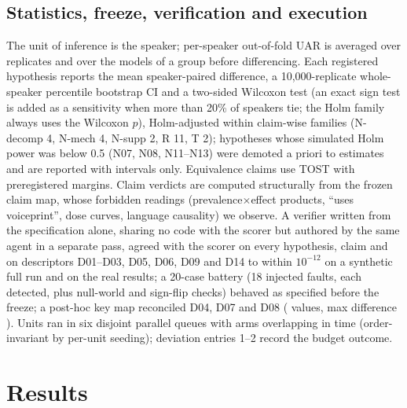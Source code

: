 \documentclass{article}
\begin{document}
\subsection{Statistics, freeze, verification and execution}
The unit of inference is the speaker; per-speaker out-of-fold UAR is averaged over replicates and over the models of a group before differencing.
Each registered hypothesis reports the mean speaker-paired difference, a 10,000-replicate whole-speaker percentile bootstrap CI and a two-sided Wilcoxon test (an exact sign test is added as a sensitivity when more than 20\% of speakers tie; the Holm family always uses the Wilcoxon $p$), Holm-adjusted within claim-wise families (N-decomp 4, N-mech 4, N-supp 2, R 11, T 2); hypotheses whose simulated Holm power was below 0.5 (N07, N08, N11--N13) were demoted a priori to estimates and are reported with intervals only.
Equivalence claims use TOST with preregistered margins.
Claim verdicts are computed structurally from the frozen claim map, whose forbidden readings (prevalence$\times$effect products, ``uses voiceprint'', dose curves, language causality) we observe.
A verifier written from the specification alone, sharing no code with the scorer but authored by the same agent in a separate pass, agreed with the scorer on every hypothesis, claim and on descriptors D01--D03, D05, D06, D09 and D14 to within $10^{-12}$ on a synthetic full run and on the real results; a 20-case battery (18 injected faults, each detected, plus null-world and sign-flip checks) behaved as specified before the freeze; a post-hoc key map reconciled D04, D07 and D08 (\DReconcileItems{} values, max difference \DReconcileMaxDiff).
Units ran in six disjoint parallel queues with arms overlapping in time (order-invariant by per-unit seeding); deviation entries 1--2 record the budget outcome.

\section{Results}
\end{document}
